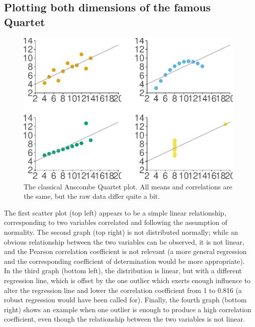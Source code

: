 \documentclass[english,floatsintext,man]{apa6}
\begin{document}
\subsection{Plotting both dimensions of the famous
Quartet}\label{plotting-both-dimensions-of-the-famous-quartet}

\begin{figure}[htbp]
\centering
\includegraphics{APA_Tidy_Paper_files/figure-latex/unnamed-chunk-2-1.pdf}
\caption{\label{fig:unnamed-chunk-2}The classical Anscombe Quartet plot. All
means and correlations are the same, but the raw data differ quite a
bit.}
\end{figure}

The first scatter plot (top left) appears to be a simple linear
relationship, corresponding to two variables correlated and following
the assumption of normality. The second graph (top right) is not
distributed normally; while an obvious relationship between the two
variables can be observed, it is not linear, and the Pearson correlation
coefficient is not relevant (a more general regression and the
corresponding coefficient of determination would be more appropriate).
In the third graph (bottom left), the distribution is linear, but with a
different regression line, which is offset by the one outlier which
exerts enough influence to alter the regression line and lower the
correlation coefficient from 1 to 0.816 (a robust regression would have
been called for). Finally, the fourth graph (bottom right) shows an
example when one outlier is enough to produce a high correlation
coefficient, even though the relationship between the two variables is
not linear.

\newpage 
\end{document}
